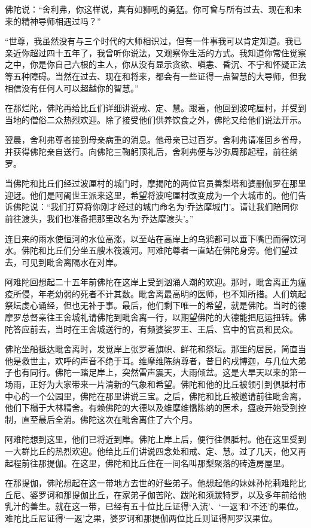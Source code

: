 \documentclass[12pt,twoside,openany]{book}
\begin{document}
佛陀说：“舍利弗，你这样说，真有如狮吼的勇猛。你可曾与所有过去、现在和未来的精神导师相遇过吗？”

“世尊，我虽然没有与三个时代的大师相识过，但有一件事我可以肯定知道。我已亲近你超过四十五年了，我曾听你说法，又观察你生活的方式。我知道你常住觉察之中，你是你自己六根的主人，你从没有显示贪欲、嗔恚、昏沉、不宁和怀疑正法等五种障碍。当然在过去、现在和将来，都会有一些证得一点智慧的大导师，但我相信没有任何人可以超越你的智慧。”

在那烂陀，佛陀再给比丘们详细讲说戒、定、慧。跟着，他回到波咤厘村，并受到当地的僧俗二众热烈欢迎。除了接受他们供养饮食之外，佛陀又给他们说法开示。

翌晨，舍利弗尊者接到母亲病重的消息。他母亲已过百岁。舍利弗请准回乡省母，并获得佛陀亲自送行。向佛陀三鞠躬顶礼后，舍利弗便与沙弥周那起程，前往纳罗。

当佛陀和比丘们经过波厘村的城门时，摩揭陀的两位官员善梨塔和婆删伽罗在那里迎迓。他们是阿阇世王派来这里，希望将波咤厘村改变成为一个大城市的。他们告诉佛陀说：“我们打算将你刚才经过的城门命名为‘乔达摩城门’。请让我们陪同你前往渡头，我们也准备把那里改名为‘乔达摩渡头’。”

连日来的雨水使恒河的水位高涨，以至站在高岸上的乌鸦都可以垂下嘴巴而得饮河水。佛陀和比丘们分坐五艘木筏渡河。阿难陀尊者一直站在佛陀身旁。他们望过去，可见到毗舍离隔水在对岸。

阿难陀回想起二十五年前佛陀在这岸上受到汹涌人潮的欢迎。那时，毗舍离正为瘟疫所侵，年老幼弱的死者不计其数。毗舍离最高明的医师，也不知所措。人们筑起祭坛虔心诵经，但也无补于事。最后，他们剩下唯一的希望，就是佛陀。当时的德摩罗总督亲往王舍城礼请佛陀到毗舍离一行，以期望佛陀的大德能把厄运扭转。佛陀答应前去，当时在王舍城送行的，有频婆娑罗王、王后、宫中的官员和民众。

佛陀坐船抵达毗舍离时，发觉岸上张罗着旗帜、鲜花和祭坛。那里的居民，简直当他是救世主，欢呼的声音不绝于耳。维摩维陈纳尊者，昔日的戌博迦，与几位大弟子也有同行。佛陀一踏足岸上，突然雷声震天，大雨倾盆。这是大旱天以来的第一场雨，正好为大家带来一片清新的气象和希望。佛陀和他的比丘被领引到俱胝村市中心的一个公园里，佛陀在那里讲说三宝。之后，佛陀和比丘被邀请前往毗舍离，他们下榻于大林精舍。有赖佛陀的大德以及维摩维憍陈纳的医术，瘟疫开始受到控制，直至最后全消。佛陀这次在毗舍离住了六个月。

阿难陀想到这里，他们已将近到岸。佛陀上岸上后，便行往俱胝村。他在这里受到一大群比丘的热烈欢迎。他给比丘们讲说四念处和戒、定、慧。过了几天，他又再起程前往那提伽。在这里，佛陀和比丘住在一间名叫那梨聚落的砖造房屋里。

在那提伽，佛陀想起在这一带地方去世的好些弟子。他想起他的妹妹孙陀莉难陀比丘尼、婆罗诃和那提伽比丘，在家弟子伽苦陀、跋陀和须跋特罗，以及多年前给他乳汁的善生。就在这一带，已经有五十位比丘证得‘入流’、‘一返’和‘不还’的果位。难陀比丘尼证得‘一返’之果，婆罗诃和那提伽两位比丘则证得阿罗汉果位。
\end{document}
